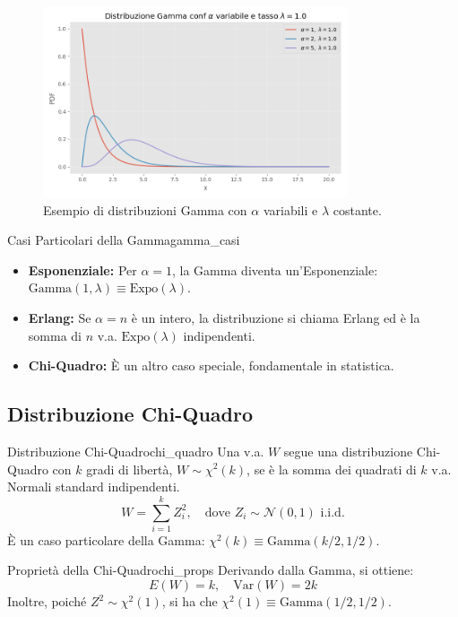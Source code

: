 \begin{figure}[H]
    \centering
    \includegraphics[width=0.8\textwidth]{images/gamma.png}
    \caption{Esempio di distribuzioni Gamma con \(\alpha\) variabili e \(\lambda\) costante.}
    \label{fig:gamma}
\end{figure}

\begin{nota}{Casi Particolari della Gamma}{gamma_casi}
\begin{itemize}
    \item \textbf{Esponenziale:} Per \(\alpha=1\), la Gamma diventa un'Esponenziale: \(\text{Gamma}(1, \lambda) \equiv \text{Expo}(\lambda)\).
    \item \textbf{Erlang:} Se \(\alpha=n\) è un intero, la distribuzione si chiama Erlang ed è la somma di \(n\) v.a. \(\text{Expo}(\lambda)\) indipendenti.
    \item \textbf{Chi-Quadro:} È un altro caso speciale, fondamentale in statistica.
\end{itemize}
\end{nota}

\subsection{Distribuzione Chi-Quadro}
\begin{definizione}{Distribuzione Chi-Quadro}{chi_quadro}
Una v.a. \(W\) segue una distribuzione Chi-Quadro con \(k\) gradi di libertà, \(W \sim \chi^2(k)\), se è la somma dei quadrati di \(k\) v.a. Normali standard indipendenti.
\[
W = \sum_{i=1}^k Z_i^2, \quad \text{dove } Z_i \sim \mathcal{N}(0,1) \text{ i.i.d.}
\]
È un caso particolare della Gamma: \( \chi^2(k) \equiv \text{Gamma}(k/2, 1/2) \).
\end{definizione}

\begin{nota}{Proprietà della Chi-Quadro}{chi_props}
Derivando dalla Gamma, si ottiene:
\[ E(W) = k, \quad \text{Var}(W) = 2k \]
Inoltre, poiché \( Z^2 \sim \chi^2(1) \), si ha che \(\chi^2(1) \equiv \text{Gamma}(1/2, 1/2)\).
\end{nota}

